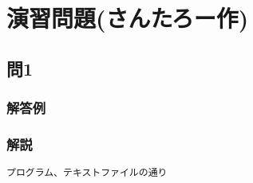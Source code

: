\section{演習問題(さんたろー作)}
\subsection{問1}
\subsubsection{解答例}

\subsubsection{解説}
\begin{verbatim}
プログラム、テキストファイルの通り
\end{verbatim}
